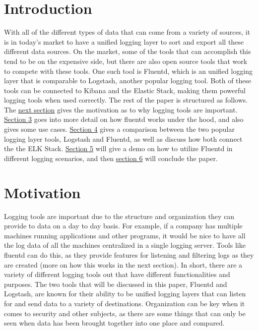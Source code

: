 \section{Introduction} \label{sec: intro}
\quad \quad 
With all of the different types of data that can come from a variety of sources, it is in today's market
to have a unified logging layer to sort and export all these different data sources. On the market, some
of the tools that can accomplish this tend to be on the expensive side, but there are also open source tools that
work to compete with these tools. One such tool is Fluentd, which is an unified logging layer that is comparable to
Logstash, another popular logging tool. Both of these tools can be connected to Kibana and the Elastic Stack, 
making them powerful logging tools when used correctly. The rest of the paper is structured as follows. The 
\hyperref[sec:motiv]{next section} gives the motivation as to why logging tools are important. 
\hyperref[sec:works]{Section 3} goes into more detail on how fluentd works under the hood, and also gives some
use cases. \hyperref[sec:comp]{Section 4} gives a comparison between the two popular logging layer tools, Logstash 
and Fluentd, as well as discuss how both connect the the ELK Stack. \hyperref[sec:demo]{Section 5} will give a demo on how to 
utilize Fluentd in different logging scenarios, and then \hyperref[sec:conclude]{section 6} will conclude the paper.
\section{Motivation} \label{sec:motiv}
\quad \quad 
Logging tools are important due to the structure and organization they can provide to data on a day to 
day basis. For example, if a company has multiple machines running applications and other programs, it would be nice 
to have all the log data of all the machines centralized in a single logging server. Tools like fluentd can do this, as 
they provide features for listening and filtering logs as they are created (more on how this works in the next section). 
In short, there are a variety of different logging tools out that have different functionalities and purposes. The two tools
that will be discussed in this paper, Fluentd and Logstash, are known for their ability to be unified logging layers that can
listen for and send data to a variety of destinations. Organization can be key when it comes to security and other subjects,
as there are some things that can only be seen when data has been brought together into one place and compared.
